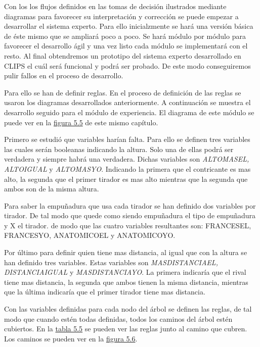 Con los los flujos definidos en las tomas de decisión ilustrados mediante diagramas para favorecer
su interpretación y corrección se puede empezar a desarrollar el sistema experto. Para ello inicialzmente
se hará una versión básica de éste mismo que se ampliará poco a poco. Se hará módulo por módulo
para favorecer el desarrollo ágil y una vez listo cada módulo se implementará con el resto.
Al final obtendremos un prototipo del sistema experto desarrollado en CLIPS el cuál será
funcional y podrá ser probado. De este modo conseguiremos pulir fallos en el proceso de desarrollo.

Para ello se han de definir reglas. En el proceso de definición de las reglas se usaron los
diagramas desarrollados anteriormente. A continuación se muestra el desarrollo seguido para el
módulo de experiencia. El diagrama de este módulo se puede ver en la \hyperref[fig:Arbol decisión experiencia]{figura 5.5} de este mismo capítulo.

Primero se estudió que variables harían falta. Para ello se definen tres variables las cuales serán booleanas
indicando la altura. Solo una de ellas podrá ser verdadera y siempre habrá una verdadera. Dichas variables son
\textit{ALTOMASEL, ALTOIGUAL} y \textit{ALTOMASYO}. Indicando la primera que el contricante es mas alto, la segunda
que el primer tirador es mas alto mientras que la segunda que ambos son de la misma altura.

Para saber la empuñadura que usa cada tirador se han definido dos variables por tirador. De tal modo que quede como
 siendo empuñadura el tipo de empuñadura y X el tirador. de modo que las cuatro variables
resultantes son: FRANCESEL, FRANCESYO, ANATOMICOEL y ANATOMICOYO.

Por último para definir quien tiene mas distancia, al igual que con la altura se han definido tres variables.
Estas variables son \textit{MASDISTANCIAEL, DISTANCIAIGUAL} y \textit{MASDISTANCIAYO}. La primera indicaría
que el rival tiene mas distancia, la segunda que ambos tienen la misma distancia, mientras que la última
indicaría que el primer tirador tiene mas distancia.

Con las variables definidas para cada nodo del árbol se definen las reglas, de tal modo que
cuando estén todas definidas, todos los caminos del árbol estén cubiertos. En la \hyperref[tab:Reglas distancia]{tabla 5.5} se pueden ver
las reglas junto al camino que cubren. Los caminos se pueden ver en la \hyperref[fig:Arbol decisión distancia con caminos numerados]{figura 5.6}.

